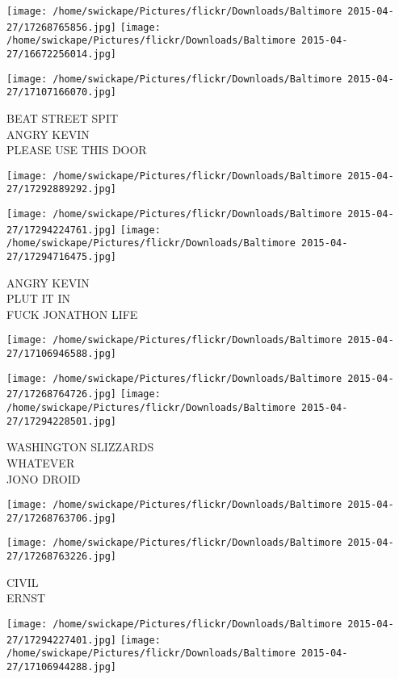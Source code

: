 \documentclass[10pt,letterpaper]{article}
\begin{document}
\texttt{[image: /home/swickape/Pictures/flickr/Downloads/Baltimore 2015-04-27/17268765856.jpg]}
\texttt{[image: /home/swickape/Pictures/flickr/Downloads/Baltimore 2015-04-27/16672256014.jpg]}

\texttt{[image: /home/swickape/Pictures/flickr/Downloads/Baltimore 2015-04-27/17107166070.jpg]}

BEAT STREET SPIT\\
ANGRY KEVIN\\
PLEASE USE THIS DOOR\\
\pagebreak

\texttt{[image: /home/swickape/Pictures/flickr/Downloads/Baltimore 2015-04-27/17292889292.jpg]}

\vspace{0.25in}
\texttt{[image: /home/swickape/Pictures/flickr/Downloads/Baltimore 2015-04-27/17294224761.jpg]}
\texttt{[image: /home/swickape/Pictures/flickr/Downloads/Baltimore 2015-04-27/17294716475.jpg]}

ANGRY KEVIN\\
PLUT IT IN\\
FUCK JONATHON LIFE\\
\pagebreak

\texttt{[image: /home/swickape/Pictures/flickr/Downloads/Baltimore 2015-04-27/17106946588.jpg]}

\vspace{0.25in}
\texttt{[image: /home/swickape/Pictures/flickr/Downloads/Baltimore 2015-04-27/17268764726.jpg]}
\texttt{[image: /home/swickape/Pictures/flickr/Downloads/Baltimore 2015-04-27/17294228501.jpg]}

WASHINGTON SLIZZARDS\\
WHATEVER\\
JONO DROID\\
\pagebreak

\texttt{[image: /home/swickape/Pictures/flickr/Downloads/Baltimore 2015-04-27/17268763706.jpg]}

\vspace{0.25in}
\texttt{[image: /home/swickape/Pictures/flickr/Downloads/Baltimore 2015-04-27/17268763226.jpg]}

CIVIL\\
ERNST\\
\pagebreak

\texttt{[image: /home/swickape/Pictures/flickr/Downloads/Baltimore 2015-04-27/17294227401.jpg]}
\texttt{[image: /home/swickape/Pictures/flickr/Downloads/Baltimore 2015-04-27/17106944288.jpg]}
\end{document}
